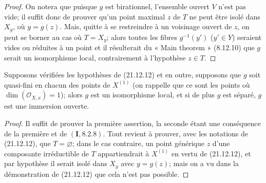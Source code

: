 \begin{proof}
On notera que puisque $g$ est birationnel, l'ensemble ouvert $V$ n'est pas vide; il
suffit donc de prouver qu'un point maximal $z$ de $T$ ne peut être isolé dans $X_y$,
où $y=g(z)$. Mais, quitte à se restreindre à un voisinage ouvert de $z$, on peut se
borner au cas où $T=X_y$; alors toutes les fibres $g^{-1}(y')$ ($y'\in Y$) seraient
vides ou réduites à un point et il résulterait du « Main theorem » (8.12.10) que $g$
serait un isomorphisme local, contrairement à l'hypothèse $z\in T$.
\end{proof}

\begin{corollary}[21.12.13]
\label{IV.21.12.13}
Supposons vérifiées les hypothèses de (21.12.12) et en outre, supposons que $g$ soit
quasi-fini en chacun des points de $X^{(1)}$ (on rappelle que ce sont les points où
$\dim(\mathcal O_{X,x})=1$); alors $g$ est un isomorphisme local, et si de plus $g$ est
séparé, $g$ est une immersion ouverte.
\end{corollary}

\begin{proof}
Il suffit de prouver la première assertion, la seconde étant une conséquence de la
première et de $(\mathbf I, 8.2.8)$. Tout revient à prouver, avec les notations de
(21.12.12), que $T=\varnothing$; dans le cas contraire, un point générique $z$ d'une
composante irréductible de $T$ appartiendrait à $X^{(1)}$ en vertu de (21.12.12), et par
hypothèse il serait isolé dans $X_y$ avec $y=g(z)$; mais on a vu dans la démonstration
de (21.12.12) que cela n'est pas possible.
\end{proof}

